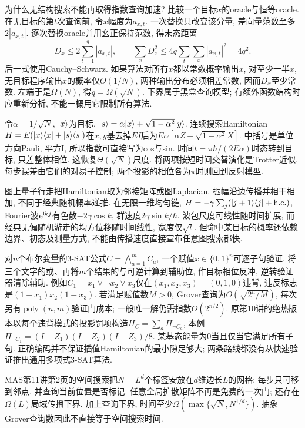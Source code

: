为什么无结构搜索不能再取得指数查询加速? 比较一个目标$x$的oracle与恒等oracle. 在无目标的第$t$次查询前, 令$x$幅度为$a_{x,t}$. 一次替换只改变该分量, 差向量范数至多$2|a_{x,t}|$. 逐次替换oracle并用幺正保持范数, 得末态距离
\[D_x\le2\sum_{t=1}^q|a_{x,t}|,\qquad
\sum_xD_x^2\le4q\sum_t\sum_x|a_{x,t}|^2=4q^2.\]
后一式使用Cauchy--Schwarz. 如果算法对所有$x$都以常数概率输出$x$, 对至少一半$x$, 无目标程序输出$x$的概率仅$O(1/N)$, 两种输出分布必须相差常数, 因而$D_x$至少常数. 左端于是$\Omega(N)$, 得$q=\Omega(\sqrt N)$. 下界属于黑盒查询模型; 有额外函数结构时应重新分析, 不能一概用它限制所有算法.

令$\alpha=1/\sqrt N$, $\lvert x\rangle$为目标, $\lvert s\rangle=\alpha\lvert x\rangle+\sqrt{1-\alpha^2}\lvert y\rangle$. 连续搜索Hamiltonian $H=E(\lvert x\rangle\langle x\rvert+\lvert s\rangle\langle s\rvert)$在$x,y$基去掉$EI$后为$E\alpha[\alpha Z+\sqrt{1-\alpha^2}X]$. 中括号是单位方向Pauli, 平方I, 所以指数可直接写为cos与sin. 时间$t=\pi\hbar/(2E\alpha)$时态转到目标, 只差整体相位. 这恢复$\Theta(\sqrt N)$尺度. 将两项按短时间交替演化是Trotter近似, 每步误差由它们的对易子控制; 两个投影的相位各为$\pi$时则回到反射模型.

图上量子行走把Hamiltonian取为邻接矩阵或图Laplacian. 振幅沿边传播并相干相加, 不同于经典随机概率递推. 在无限一维均匀链, $H=-\gamma\sum_j(\lvert j+1\rangle\langle j\rvert+\mathrm{h.c.})$, Fourier波$\mathrm e^{\mathrm i kj}$有色散$-2\gamma\cos k$, 群速度$2\gamma\sin k/\hbar$. 波包尺度可线性随时间扩展, 而经典无偏随机游走的均方位移随时间线性, 宽度仅$\sqrt t$. 但命中某目标的概率还依赖边界、初态及测量方式, 不能由传播速度直接宣布任意图搜索都快.

对$n$个布尔变量的3-SAT公式$C=\bigwedge_{a=1}^m C_a$, 一个赋值$x\in\{0,1\}^n$可逐子句验证. 将三个文字的或、再将$m$个结果的与可逆计算到辅助位, 作目标相位反冲, 逆转验证器清除辅助. 例如$C_1=x_1\lor\neg x_2\lor x_3$仅在$(x_1,x_2,x_3)=(0,1,0)$违背, 违反标志是$(1-x_1)x_2(1-x_3)$. 若满足赋值数$M>0$, Grover查询为$O(\sqrt{2^n/M})$, 每次另有$\operatorname{poly}(n,m)$验证门成本; 一般唯一解仍需指数$O(2^{n/2})$. 原第10讲的绝热版本以每个违背模式的投影罚项构造$H_C=\sum_a\Pi_{\neg C_a}$, 本例$\Pi_{\neg C_1}=(I+Z_1)(I-Z_2)(I+Z_3)/8$. 某基态能量为0当且仅当它满足所有子句. 正确编码并不保证插值Hamiltonian的最小隙足够大; 两条路线都没有从快速验证推出通用多项式3-SAT算法.

MAS第11讲第2页的空间搜索把$N=L^d$个标签安放在$d$维边长$L$的网格: 每步只可移到邻点, 并查询当前位置是否标记. 任意全局扩散矩阵不再是免费的一次门; 还存在$\Omega(L)$局域传播下界. 加上查询下界, 时间至少$\Omega(\max\{\sqrt N,N^{1/d}\})$. 抽象Grover查询数因此不直接等于空间搜索时间.

